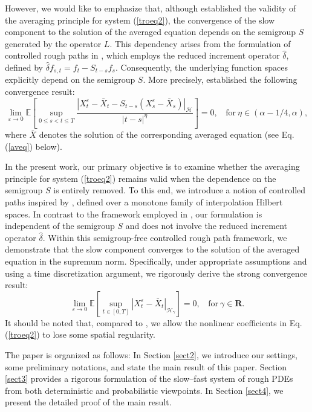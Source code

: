 \documentclass[10pt,a4paper]{article}
\numberwithin{equation}{section}
\begin{document}
However, we would like to emphasize that, although \cite{LLPX25} established the validity of the averaging principle for system (\ref{troeq2}), the convergence of the slow component to the solution of the averaged equation depends on the semigroup $S$ generated by the operator $L$.
This dependency arises from the formulation of controlled rough paths in \cite{LLPX25}, which employs the reduced increment operator $\hat{\delta}$, defined by $\hat{\delta} f_{s,t} = f_t - S_{t-s}f_s$.
Consequently, the underlying function spaces explicitly depend on the semigroup $S$.
More precisely, \cite{LLPX25} established the following convergence result:
\begin{equation*}
\lim_{\varepsilon\rightarrow 0}  \mathbb E\left[\sup_{0\leq s<t\leq T} \frac {|X_t^\varepsilon-\bar{X}_t-S_{t-s}(X_s^\varepsilon-\bar{X}_s)|_{\mathcal H}}{|t-s|^\eta}\right]=0,~~~~\text{for} ~\eta \in (\alpha-1/4,\alpha),
\end{equation*}
where $\bar{X}$ denotes the solution of the corresponding averaged equation (see Eq. (\ref{aveq}) below).





In the present work, our primary objective is to examine whether the averaging principle for system (\ref{troeq2}) remains valid when the dependence on the semigroup $S$ is entirely removed.
To this end, we introduce a notion of controlled paths inspired by \cite{GHN21}, defined over a monotone family of interpolation Hilbert spaces.
In contrast to the framework employed in \cite{GH19,GT10}, our formulation is independent of the semigroup $S$ and does not involve the reduced increment operator $\hat{\delta}$.
Within this semigroup-free controlled rough path framework, we demonstrate that the slow component converges to the solution of the averaged equation in the supremum norm. Specifically, under appropriate assumptions and using a time discretization argument, we rigorously derive the strong convergence result:
\begin{equation*}
\lim_{\varepsilon\rightarrow 0}  \mathbb E\left[\sup_{t\in [0,T]} |X_t^\varepsilon-\bar{X}_t|_{\mathcal H_{\gamma} }\right]=0, ~~~~\text{for}~ \gamma \in  \mathbf R.
\end{equation*}
It should be noted that, compared to \cite{LLPX25}, we allow the nonlinear coefficients in Eq. (\ref{troeq2}) to lose some spatial regularity.



The paper is organized as follows: In Section \ref{sect2}, we introduce our settings, some preliminary notations, and state the main result of this paper. Section \ref{sect3} provides a rigorous formulation of the slow--fast system of rough PDEs from both deterministic and probabilistic viewpoints.
In Section \ref{sect4}, we present the detailed proof of the main result.
\end{document}
